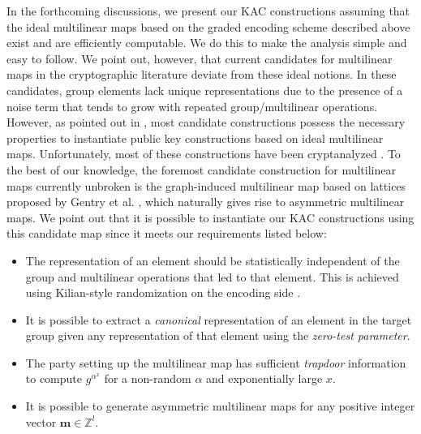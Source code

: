 In the forthcoming discussions, we present our KAC constructions assuming that the ideal multilinear maps based on the graded encoding scheme described above exist and are efficiently computable. We do this to make the analysis simple and easy to follow. We point out, however, that current candidates for multilinear maps in the cryptographic literature deviate from these ideal notions. In these candidates, group elements lack unique representations due to the presence of a noise term that tends to grow with repeated group/multilinear operations. However, as pointed out in \cite{boneh2014low}, most candidate constructions \cite{garg2013candidate,coron2013practical,gentry2014zeroizing,boneh2014immunizing} possess the necessary properties to instantiate public key constructions based on ideal multilinear maps. Unfortunately, most of these constructions have been cryptanalyzed \cite{cheon2015cryptanalysis,coron2014cryptanalysis}. To the best of our knowledge, the foremost candidate construction for multilinear maps currently unbroken is the graph-induced multilinear map based on lattices proposed by Gentry et al. \cite{gentry2015graph}, which naturally gives rise to asymmetric multilinear maps. We point out that it is possible to instantiate our KAC constructions using this candidate map since it meets our requirements listed below:

\let\labelitemi\labelitemii

\begin{itemize}
 \item The representation of an element should be statistically independent of the group and multilinear operations that led to that element. This is achieved using Kilian-style randomization \cite{kilian1988founding} on the encoding side \cite{gentry2015graph}.\\
 \item It is possible to extract a \emph{canonical} representation of an element in the target group given any representation of that element using the \emph{zero-test parameter}.\\
 \item The party setting up the multilinear map has sufficient \emph{trapdoor} information to compute $g^{\alpha^x}$ for a non-random $\alpha$ and exponentially large $x$.\\
 \item It is possible to generate asymmetric multilinear maps for any positive integer vector $\mathbf{m}\in\mathbb{Z}^l$.\\
\end{itemize}

